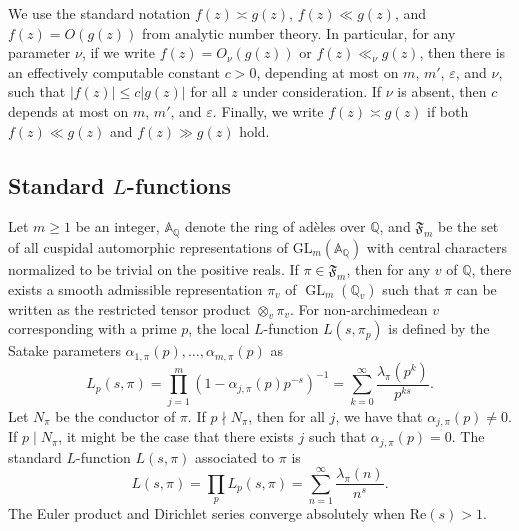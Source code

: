 \documentclass[12pt,reqno]{amsart}
\theoremstyle{remark}
\DeclareMathOperator{\GL}{GL}
\numberwithin{equation}{section}
\begin{document}
    We use the standard notation $f(z) \asymp g(z)$, $f(z) \ll g(z)$, and $f(z) = O(g(z))$ from analytic number theory. In particular,
    for any parameter $\nu$, if
    we write $f(z) = O_{\nu}(g(z))$ or $f(z) \ll_{\nu} g(z)$, then there is an effectively computable constant $c>0$, depending at most on $m$, $m'$, $\varepsilon$, and $\nu$, such that $|f(z)| \le c|g(z)|$ for all $z$ under consideration. If $\nu$ is absent, then $c$ depends at most on $m$, $m'$, and $\varepsilon$. Finally, we write $f(z) \asymp g(z)$ if both $f(z) \ll g(z)$ and $f(z) \gg g(z)$ hold.

	
	
    \subsection{Standard \texorpdfstring{$L$}{L}-functions}
    \label{subsec: standardL}
    
    Let $m \ge 1$ be an integer, $\mathbb{A}_{\mathbb{Q}}$ denote the ring of ad\`{e}les over $\mathbb{Q}$, and $\mathfrak{F}_m$ be the set of all cuspidal automorphic representations of $\mathrm{GL}_m(\mathbb{A}_{\mathbb{Q}})$ with central characters normalized to be trivial on the positive reals.  
    If $\pi\in\mathfrak{F}_m$, then for any $v$ of $\mathbb{Q}$, there exists a smooth admissible representation $\pi_v$ of $\GL_m(\mathbb{Q}_v)$ such that  $\pi$ can be written as the restricted tensor product $\otimes_v \pi_v$.  
    For non-archimedean $v$ corresponding with a prime $p$, the local $L$-function $L(s,\pi_{p})$ is defined by the Satake parameters $\alpha_{1,\pi}(p),\ldots,\alpha_{m,\pi}(p)$ as
    \begin{equation}
	\label{eqn:Euler_p_single}
        L_p(s,\pi)=\prod_{j=1}^{m}(1-\alpha_{j,\pi}(p)p^{-s})^{-1}=\sum_{k=0}^{\infty}\frac{\lambda_{\pi}(p^k)}{p^{ks}}.
    \end{equation}
     Let $N_{\pi}$ be the conductor of $\pi$. 
    If $p\nmid N_{\pi}$, then for all $j$, we have that $\alpha_{j,\pi}(p)\neq0$.  If $p\mid N_{\pi}$, it might be the case that there exists $j$ such that $\alpha_{j,\pi}(p)=0$.  The standard $L$-function $L(s,\pi)$ associated to $\pi$ is
    \[
        L(s,\pi)=\prod_{p} L_{p}(s,\pi)=\sum_{n=1}^{\infty}\frac{\lambda_{\pi}(n)}{n^s}.
    \]
    The Euler product and Dirichlet series converge absolutely when $\mathrm{Re}(s)>1$.
	
\end{document}
